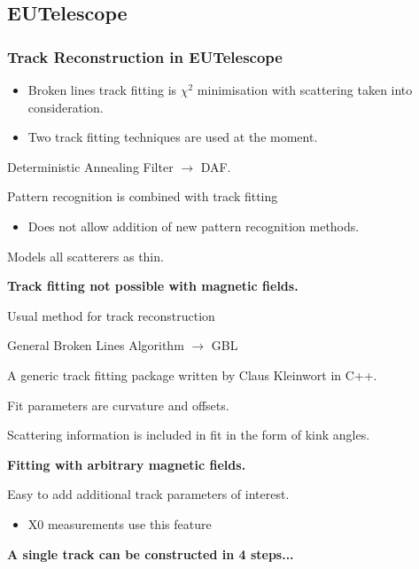 \documentclass{beamer}
\begin{document}
\subsection{EUTelescope}
\begin{frame}
\frametitle{Track Reconstruction in EUTelescope}
\begin{itemize}
\item Broken lines track fitting is $\chi^{2}$ minimisation with scattering taken into consideration.
\item Two track fitting techniques are used at the moment.
\end{itemize}
\small{
\begin{enumerate}
\item Deterministic Annealing Filter $\rightarrow$ DAF. 
\begin{itemize}
\small{
\item Pattern recognition is combined with track fitting
\begin{itemize}
\item Does not allow addition of new pattern recognition methods. 
\end{itemize}
\item Models all scatterers as thin.
\item \textbf{Track fitting not possible with magnetic fields.} 
\item Usual method for track reconstruction
}
\end{itemize}
\item  General Broken Lines Algorithm $\rightarrow$ GBL
\begin{itemize}
\small{
\item A generic track fitting package written by Claus Kleinwort in C++.
\item Fit parameters are curvature and offsets. 
\item Scattering information is included in fit in the form of kink angles.
\item \textbf{Fitting with arbitrary magnetic fields.}
\item Easy to add additional track parameters of interest.
\begin{itemize}
\item X0 measurements use this feature
\end{itemize}
}
\end{itemize}
\end{enumerate}
}
\textbf{A single track can be constructed in 4 steps...} 
\end{frame}
\end{document}

